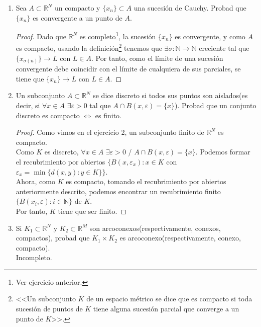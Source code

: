 \documentclass[a4paper, 11pt]{article} %
\begin{document}
\begin{enumerate}
\begin{proof}
		Como se tiene que $(\mathbb{R}^N, ||\cdot||_2)$ es completo y que todas las normas son equivalentes en $\mathbb{R}^N$, se tiene que $\mathbb{R}^N$ es completo con cualquier norma.
	\end{proof}
	\item Sea $A \subset \mathbb{R}^N$ un compacto y $\{x_n\} \subset A$ una sucesión de Cauchy. Probad que $\{x_n\}$ es convergente a un punto de $A$.
	\begin{proof}
		Dado que $\mathbb{R}^N$ es completo\footnote[12]{Ver ejercicio anterior.}, la sucesión $\{x_n\}$ es convergente, y como $A$ es compacto, usando la definición\footnote[13]{<<Un subconjunto $K$ de un espacio métrico se dice que es compacto si toda sucesión de puntos de $K$ tiene alguna sucesión parcial que converge a un punto de $K$>>.} tenemos que $\exists \sigma: \mathbb{N} \rightarrow \mathbb{N}$ creciente tal que $\{x_{\sigma(n)}\} \rightarrow L$ con $L \in A$. Por tanto, como el límite de una sucesión convergente debe coincidir con el límite de cualquiera de sus parciales, se tiene que $\{x_n\} \rightarrow L$ con $L \in A$.
	\end{proof}
	\item Un subconjunto $A \subset \mathbb{R}^N$ se dice discreto si todos sus puntos son aislados(es decir, si $\forall x \in A$ $\exists \varepsilon > 0$ tal que $A \cap B(x,\varepsilon) = \{x\}$). Probad que un conjunto discreto es compacto $\Leftrightarrow$ es finito.
	\begin{proof}
		\fbox{$\Leftarrow$} Como vimos en el ejercicio 2, un subconjunto finito de $\mathbb{R}^N$ es compacto.\\
		\fbox{$\Rightarrow$} Como $K$ es discreto, $\forall x \in A$ $\exists \varepsilon > 0$  /  $A \cap B(x,\varepsilon) = \{x\}$. Podemos formar el recubrimiento por abiertos $\{B(x, \varepsilon_x): x \in K$ con $\varepsilon_x = \min\{d(x,y): y \in K\}\}$.\\
		Ahora, como $K$ es compacto, tomando el recubrimiento por abiertos anteriormente descrito, podemos encontrar un recubrimiento finito $\{B(x_i, \varepsilon): i \in \mathbb{N}\}$ de $K$.\\
		Por tanto, $K$ tiene que ser finito.
	\end{proof}
	\item Si $K_1 \subset \mathbb{R}^N$ y $K_2 \subset \mathbb{R}^M$ son arcoconexos(respectivamente, conexos, compactos), probad que $K_1 \times K_2$ es arcoconexo(respectivamente, conexo, compacto).\\
	Incompleto.
\end{enumerate}
\end{document}
